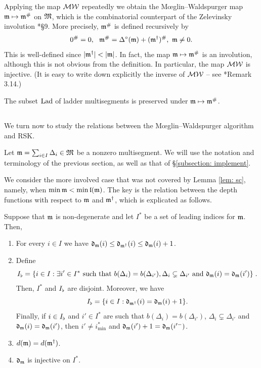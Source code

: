 \documentclass{ert-l} %
\begin{document}
Applying the map $\mathcal{MW}$ repeatedly we obtain the M\oe glin--Waldspurger map $\mathfrak{m}\mapsto\mathfrak{m}^\#$ on $\mathfrak{M}$,
which is the combinatorial counterpart of the Zelevinsky involution \cite{MR584084}*{\S9}.
More precisely, $\mathfrak{m}^\#$ is defined recursively by
\[
0^\#=0,\ \ \m^\#=\Delta^{\nMW}(\m)+(\m^{\MWn})^\#,\ \m\ne0.
\]
This is well-defined since $|\m^{\MWn}|<|\m|$.
In fact, the map $\mathfrak{m}\mapsto\mathfrak{m}^\#$ is an involution, although this is not obvious from the definition.
In particular, the map $\mathcal{MW}$ is injective.
(It is easy to write down explicitly the inverse of $\mathcal{MW}$ -- see \cite{MR3866895}*{Remark 3.14}.)

The subset $\operatorname{Lad}$ of ladder multisegments is preserved under $\mathfrak{m}\mapsto\mathfrak{m}^\#$.

\subsection{}
We turn now to study the relations between the M\oe glin--Waldspurger algorithm and RSK.

Let $\mathfrak{m}= \sum_{i\in I} \Delta_i \in \mathfrak{M}$ be a nonzero multisegment.
We will use the notation and terminology of the previous section, as well as that of \S\ref{subsection: implement}.

We consider the more involved case that was not covered by Lemma \ref{lem: sc}, namely, when $\min\mathfrak{m}<\min\mathfrak{l}(\mathfrak{m})$.
The key is the relation between the depth functions with respect to $\mathfrak{m}$ and $\mathfrak{m}^{\dagger}$, which
is explicated as follows.

\begin{lemma} \label{lem: pre1}
Suppose that $\mathfrak{m}$ is non-degenerate and let $I^*$ be a set of leading indices for $\mathfrak{m}$. Then,
\begin{enumerate}
\item For every $i\in I$ we have $\mathfrak{d}_{\mathfrak{m}}(i)\le\mathfrak{d}_{\mathfrak{m}^{\dagger}}(i)\le\mathfrak{d}_{\mathfrak{m}}(i)+1$.
\item\label{it: change} Define
\[
I_{\flat}=\{i\in I:\exists i'\in I^*\text{ such that }b(\Delta_i)=b(\Delta_{i'}), \Delta_i\subsetneq\Delta_{i'}
\text{ and }\mathfrak{d}_{\mathfrak{m}}(i)=\mathfrak{d}_{\mathfrak{m}}(i')\}\;.
\]
Then, $I^*$ and $I_{\flat}$ are disjoint. Moreover, we have
\[
I_{\flat}=\{i\in I:\mathfrak{d}_{\mathfrak{m}^{\dagger}}(i)=\mathfrak{d}_{\mathfrak{m}}(i)+1\}.
\]
Finally, if $i\in I_{\flat}$ and $i'\in I^*$ are such that $b(\Delta_i)=b(\Delta_{i'})$, $\Delta_i\subsetneq\Delta_{i'}$  and $\mathfrak{d}_{\mathfrak{m}}(i)=\mathfrak{d}_{\mathfrak{m}}(i')$, then $i'\neq i^*_{\min}$ and
$\mathfrak{d}_{\mathfrak{m}}(i')+1=\mathfrak{d}_{\mathfrak{m}}(i'^-)$.
\item $d(\mathfrak{m})=d(\mathfrak{m}^{\dagger})$.
\item $\mathfrak{d}_{\mathfrak{m}}$ is injective on $I^*$.
\end{enumerate}
\end{lemma}
\end{document}
